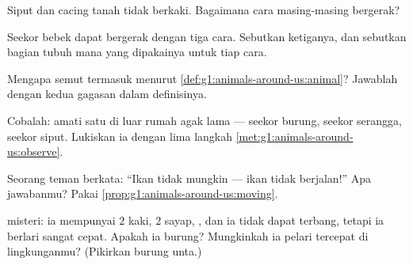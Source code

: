 \begin{exercise}[$\star$]\label{exo:g1:animals-around-us:5}
Siput dan cacing tanah tidak berkaki. Bagaimana cara masing-masing
bergerak?
\end{exercise}

\begin{exercise}[$\star$]\label{exo:g1:animals-around-us:6}
Seekor bebek dapat bergerak dengan tiga cara. Sebutkan ketiganya, dan
sebutkan bagian tubuh mana yang dipakainya untuk tiap cara.
\end{exercise}

\begin{exercise}[$\star$]\label{exo:g1:animals-around-us:7}
Mengapa semut termasuk  menurut \cref{def:g1:animals-around-us:animal}?
Jawablah dengan kedua gagasan dalam definisinya.
\end{exercise}

\begin{exercise}[$\star$]\label{exo:g1:animals-around-us:8}
Cobalah: amati satu  di luar rumah agak lama --- seekor burung,
seekor serangga, seekor siput. Lukiskan ia dengan lima langkah
\cref{met:g1:animals-around-us:observe}.
\end{exercise}

\begin{exercise}[$\star\star$]\label{exo:g1:animals-around-us:9}
Seorang teman berkata: ``Ikan tidak mungkin  --- ikan tidak
berjalan!'' Apa jawabanmu? Pakai \cref{prop:g1:animals-around-us:moving}.
\end{exercise}

\begin{exercise}[$\star\star$]\label{exo:g1:animals-around-us:10}
 misteri: ia mempunyai $2$ kaki, $2$ sayap, , dan ia
tidak dapat terbang, tetapi ia berlari sangat cepat. Apakah ia burung?
Mungkinkah ia pelari tercepat di lingkunganmu? (Pikirkan burung unta.)
\end{exercise}
